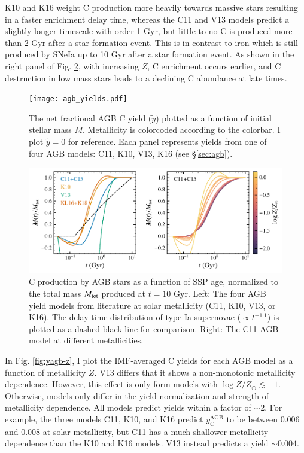 \documentclass[12pt,oneside]{report}
\begin{document}
K10 and K16 weight C production more heavily towards massive stars resulting in a faster enrichment delay time, whereas the C11 and V13 models predict a slightly longer timescale with order 1 Gyr, but little to no C is produced more than 2 Gyr after a star formation event. This is in contrast to iron which is still produced by SNeIa up to 10 Gyr after a star formation event. 
As shown in the right panel of Fig. \ref{fig:agb-ssp}, with increasing $Z$, C enrichment occurs earlier, and C destruction in low mass stars leads to a declining C abundance at late times.
    

\begin{figure}
    \centering
 	    \texttt{[image: agb\_yields.pdf]}
        \caption[AGB C yields]{The net fractional AGB C yield ($\tilde{y}$) plotted as a function of initial stellar mass $M$. Metallicity is colorcoded according to the colorbar. I plot $\tilde{y}=0$ for reference. Each panel represents yields from one of four AGB models: C11, K10, V13, K16 (see \S \ref{sec:agb}). }
        \label{fig:y_agb}
\end{figure}
\begin{figure}
    \includegraphics[scale=1]{y_agb_t2.pdf}

    \caption[AGB yields delay time distribution]{
        C production by AGB stars as a function of SSP age, normalized to the total mass $M_{\rm tot}$ produced at $t=10$ Gyr. Left: The four AGB yield models from literature at solar metallicity (C11, K10, V13, or K16). The delay time distribution of type Ia supernovae ($\propto t^{-1.1}$) is plotted as a dashed black line for comparison. Right: The C11 AGB model at different metallicities. }
    \label{fig:agb-ssp}
\end{figure}


In Fig. \ref{fig:yagb-z}, I plot the IMF-averaged C yields for each AGB model as a function of metallicity $Z$.
V13 differs that it shows a non-monotonic metallicity dependence. However, this effect is only form models with $\log Z/Z_\odot \lesssim -1$.
Otherwise, models only differ in the yield normalization and strength of metallicity dependence. All models predict yields within a factor of $\sim 2$.
For example, the three models C11, K10, and K16 predict $y_\text{C}^\text{AGB}$ to be between 0.006 and 0.008 at solar metallicity, but C11 has a much shallower metallicity dependence than the K10 and K16 models. V13 instead predicts a yield $\sim 0.004$.
\end{document}
